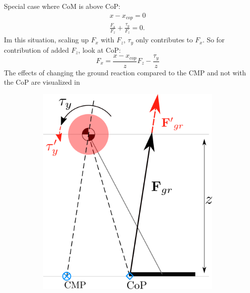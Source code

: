 Special case where \ac{CoM} is above \ac{CoP}:
\begin{align}
     x-x_{cop}=0\\
     \frac{F_x}{F_z}+\frac{\tau_y}{F_z}=0.
\end{align}
Im this situation, scaling up $F_x$ with $F_z$, $\tau_y$ only contributes to $F_x$. So for contribution of added $F_z$, look at \ac{CoP}:
\begin{equation}
    F_{x} = \frac{x-x_{cop}}{z}F_z - \frac{\tau_y}{z}
\end{equation}
The effects of changing the ground reaction compared to the \ac{CMP} and not with the \ac{CoP} are visualized in 
\begin{figure}[h]
  \begin{subfigure}{0.3\textwidth}
  \centering
  \includegraphics[width=.8\linewidth]{STYLESTUFF/2DCMPVIZ.png}
   \caption{}
    \label{fig:cmpFza}
  \end{subfigure}
  \begin{subfigure}{0.3\textwidth}
    \centering

\end{subfigure}
\end{figure}
